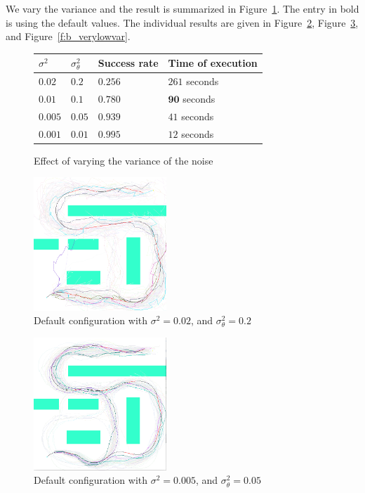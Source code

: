 \documentclass[a4paper]{article}
\begin{document}
We vary the variance and the result is summarized in
Figure~\ref{f:variance}. The entry in bold is using the default values.
The individual results are given in Figure~\ref{f:b_veryhivar}, Figure~\ref{f:b_lowvar},
and Figure~\ref{f:b_verylowvar}.

\begin{figure}
\caption{Effect of varying the variance of the noise}
\label{f:variance}
\begin{tabular}{ l | l | l | l }
  $\sigma^2$ & $\sigma_\theta^2$ & Success rate & Time of execution \\ \hline \hline
  $0.02$ & $0.2$ & $0.256$ & $261$ seconds \\ \hline  %
  $\mathbf{0.01}$ & $\mathbf{0.1}$ & $\mathbf{0.780}$ & $\mathbf{90}$ seconds \\ \hline
  $0.005$ & $0.05$ & $0.939$ & $41$ seconds \\ \hline  %
  $0.001$ & $0.01$ & $0.995$ & $12$ seconds \\ \hline  %
\end{tabular}
\end{figure}

\begin{figure}
\caption{Default configuration with $\sigma^2=0.02$, and $\sigma_\theta^2=0.2$}
\label{f:b_veryhivar}
\centerline{\includegraphics[width=5cm]{b_veryhivar.png}}
\end{figure}

\begin{figure}
\caption{Default configuration with $\sigma^2=0.005$, and $\sigma_\theta^2=0.05$}
\label{f:b_lowvar}
\centerline{\includegraphics[width=5cm]{b_lowvar.png}}
\end{figure}
\end{document}
